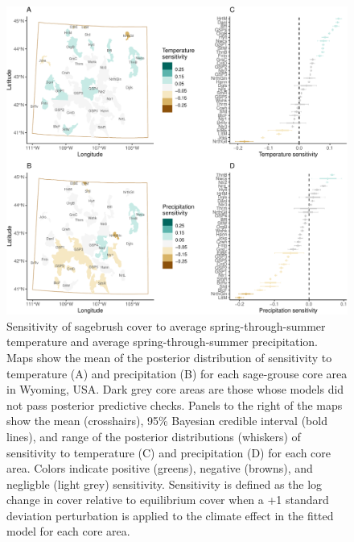 \documentclass[
  12pt,
]{article}
\begin{document}
\begin{figure}
\centering
\includegraphics{sageCastManuscript_files/figure-latex/sensitivities-1.pdf}
\caption{\label{fig:sensitivities}Sensitivity of sagebrush cover to average spring-through-summer temperature and average spring-through-summer precipitation. Maps show the mean of the posterior distribution of sensitivity to temperature (A) and precipitation (B) for each sage-grouse core area in Wyoming, USA. Dark grey core areas are those whose models did not pass posterior predictive checks. Panels to the right of the maps show the mean (crosshairs), 95\% Bayesian credible interval (bold lines), and range of the posterior distributions (whiskers) of sensitivity to temperature (C) and precipitation (D) for each core area. Colors indicate positive (greens), negative (browns), and negligble (light grey) sensitivity. Sensitivity is defined as the log change in cover relative to equilibrium cover when a +1 standard deviation perturbation is applied to the climate effect in the fitted model for each core area.}
\end{figure}
\end{document}
